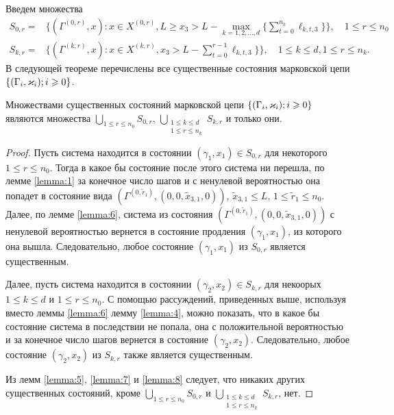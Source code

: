 \documentclass[a4paper,12pt,russian]{extarticle}
\newcommand{\G}{\Gamma}
\newcommand{\Mark}{\{(\G_i, \vk_i); i \geqslant 0\}}
\newcommand{\ga}[1]{\Gamma^{\left( #1 \right)} }
\begin{document}
Введем множества
\begin{equation*}
\begin{aligned}
S_{0,r} = & \{(\ga{0,r},x) \colon x\in X^{(0,r)}, L \geqslant x_3 > L - \max\limits_{k=1, 2, \ldots, d}\{\sum_{t=0}^{n_k} \ell_{k,t,3}\}\}, \quad 1 \leqslant r \leqslant n_0 \\
S_{k,r} = & \{(\ga{k,r},x) \colon x\in X^{(k,r)},x_3 > L - \sum_{t=0}^{r-1} \ell_{k,t,3}\} \}, \quad 1 \leqslant k \leqslant d, 1 \leqslant r \leqslant n_k.
\end{aligned}
\end{equation*}
В следующей теореме перечислены все существенные состояния марковской цепи $\Mark$.
\begin{theorem}
Множествами существенных состояний марковской цепи $\Mark$ являются множества $\bigcup\limits_{1 \leqslant r \leqslant n_0}S_{0,r}$, $\bigcup\limits_{\substack{1 \leqslant k \leqslant d\\ 1 \leqslant r \leqslant n_k}} S_{k,r}$ и только они.
\end{theorem}
\begin{proof}
Пусть система находится в состоянии $(\gamma_1,x_1) \in S_{0,r}$ для некоторого $1 \leqslant r \leqslant n_0$. Тогда в какое бы состояние после этого система ни перешла, по лемме \ref{lemma:1} за конечное число шагов и с ненулевой вероятностью она попадет в состояние вида $(\ga{0,\tilde{r}_1}, (0,0,\tilde{x}_{3,1},0))$, $\tilde{x}_{3,1} \leqslant L$, $1 \leqslant \tilde{r}_1 \leqslant n_0$.  Далее, по лемме \ref{lemma:6}, система из состояния $(\ga{0,\tilde{r}_1}, (0,0,\tilde{x}_{3,1},0))$ с ненулевой вероятностью вернется в состояние продления $(\gamma_1,x_1)$, из которого она вышла. Следовательно, любое состояние $(\gamma_1,x_1)$ из $S_{0,r}$ является существенным.

Далее, пусть система находится в состоянии $(\gamma_2,x_2) \in S_{k,r}$ для некоорых $1 \leqslant k \leqslant d$ и  $1 \leqslant r \leqslant n_0$. С помощью рассуждений, приведенных выше, используя вместо леммы \ref{lemma:6} лемму \ref{lemma:4}, можно показать, что в какое бы состояние система в последствии не попала, она с положительной вероятностью и за конечное число шагов вернется в состояние $(\gamma_2,x_2)$. Следовательно, любое состояние $(\gamma_2,x_2)$ из $S_{k,r}$ также является существенным.

Из лемм \ref{lemma:5}, \ref{lemma:7} и \ref{lemma:8} следует, что никаких других существенных состояний, кроме $\bigcup\limits_{1 \leqslant r \leqslant n_0}S_{0,r}$ и $\bigcup\limits_{\substack{1 \leqslant k \leqslant d\\ 1 \leqslant r \leqslant n_k}} S_{k,r}$,  нет.
\end{proof}
\end{document}
